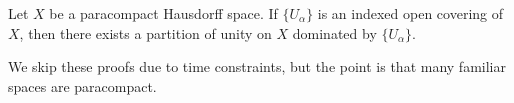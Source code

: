  Let \(X\) be a paracompact Hausdorff space. If \(\{U_\alpha\}\) is an indexed open covering of \(X\), then there exists a partition of unity on \(X\) dominated by \(\{U_\alpha\}\).

We skip these proofs due to time constraints, but the point is that many familiar spaces are paracompact.

\pagebreak
